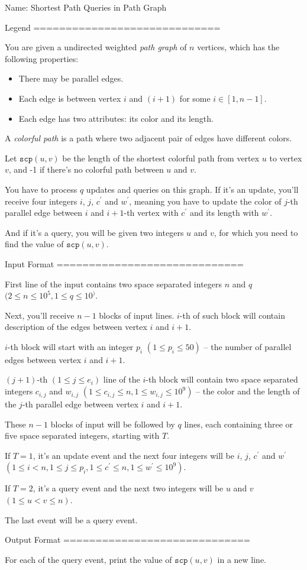 Name: Shortest Path Queries in Path Graph

Legend
=============================

You are given a undirected weighted \textit{path graph} of $n$ vertices,
which has the following properties:
\begin{itemize}
  \item There may be parallel edges.
  \item Each edge is between vertex $i$ and $(i+1)$ for some $i \in [1,
    n-1]$.
  \item Each edge has two attributes: its color and its length.
\end{itemize}

A \textit{colorful path} is a path where two adjacent pair of edges have
different colors.

Let $\texttt{scp}(u, v)$ be the length of the shortest colorful path from
vertex $u$ to vertex $v$, and -1 if there's no colorful path between $u$ and
$v$.

You have to process $q$ updates and queries on this graph. If it's an update,
you'll receive four integers $i$, $j$, $c^\prime$ and $w^\prime$, meaning you
have to update the color of $j$-th parallel edge between $i$ and $i+1$-th
vertex with $c^\prime$ and its length with $w^\prime$.

And if it's a query, you will be given two integers $u$ and $v$, for which
you need to find the value of $\texttt{scp}(u, v)$.


Input Format
=============================

First line of the input contains two space separated integers $n$
and $q$ $(2 \le n \le 10^5, 1 \le q \le 10^)$.

Next, you'll receive $n-1$ blocks of input lines. $i$-th of such block will
contain description of the edges between vertex $i$ and $i+1$.

$i$-th block will start with an integer $p_i$ $(1 \le p_i \le 50)$ -- the
number of parallel edges between vertex $i$ and $i+1$.

$(j+1)$-th $(1 \le j \le e_i)$ line of the $i$-th block will contain two
space separated integers $c_{i, j}$ and $w_{i, j}$ $(1 \le c_{i, j} \le n,
1 \le w_{i, j} \le 10^9)$ -- the color and the
length of the $j$-th parallel edge between vertex $i$ and $i+1$.

These $n-1$ blocks of input will be followed by $q$ lines, each containing
three or five space separated integers, starting with $T$.

If $T = 1$, it's an update event and the next four integers will be $i$,
$j$, $c^\prime$ and $w^\prime$ $(1 \le i < n, 1 \le j \le p_i, 1 \le
c^\prime \le n, 1 \le w^\prime \le 10^9)$.

If $T = 2$, it's a query event and the next two integers will be $u$ and $v$
$(1 \le u < v \le n)$.

The last event will be a query event.


Output Format
=============================

For each of the query event, print the value of $\texttt{scp}(u, v)$ in a new
line.
